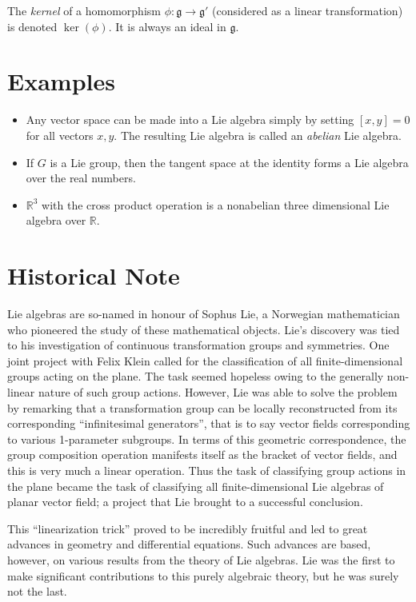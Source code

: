 \documentclass{article}
\newcommand{\g}{\mathfrak{g}}
\begin{document}
The {\em kernel} of a homomorphism $\phi: \g \to \g'$ (considered as a linear transformation) is denoted $\ker(\phi)$. It is always an ideal in $\g$.

\section{Examples}

\begin{itemize}
\item Any vector space can be made into a Lie algebra simply by setting $[x,y] = 0$ for all vectors $x,y$. The resulting Lie algebra is called an {\em abelian} Lie algebra.
\item If $G$ is a Lie group, then the tangent space at the identity forms a Lie algebra over the real numbers.
\item $\mathbb{R}^3$ with the cross product operation is a nonabelian three dimensional Lie algebra over $\mathbb{R}$.
\end{itemize}

\section{Historical Note}
Lie algebras are so-named in honour of Sophus Lie, a Norwegian
mathematician who pioneered the study of these mathematical objects.
Lie's discovery was tied to his investigation of continuous
transformation groups and symmetries.  One joint project with Felix
Klein called for the classification of all finite-dimensional groups
acting on the plane.  The task seemed hopeless owing to the generally
non-linear nature of such group actions.  However, Lie was able to
solve the problem by remarking that a transformation group can be
locally reconstructed from its corresponding ``infinitesimal
generators'', that is to say vector fields corresponding to various
1-parameter subgroups.  In terms of this geometric correspondence, the
group composition operation manifests itself as the bracket of vector
fields, and this is very much a linear operation.  Thus the task of
classifying group actions in the plane became the task of classifying
all finite-dimensional Lie algebras of planar vector field; a project
that Lie brought to a successful conclusion.

This ``linearization trick'' proved to be incredibly fruitful and led
to great advances in geometry and differential equations.  Such
advances are based, however, on various results from the theory of  Lie
algebras.   Lie was the first to make significant contributions to this
purely algebraic theory, but he was surely not the last.
\end{document}
